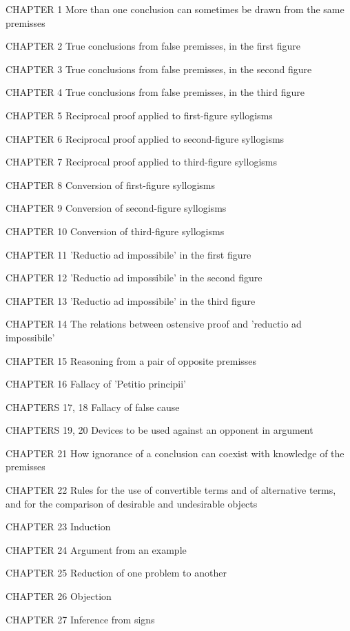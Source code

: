 CHAPTER 1
More than one conclusion can sometimes be drawn from the same
premisses

CHAPTER 2
True conclusions from false premisses, in the first figure

CHAPTER 3
True conclusions from false premisses, in the second figure

CHAPTER 4
True conclusions from false premisses, in the third figure

CHAPTER 5
Reciprocal proof applied to first-figure syllogisms

CHAPTER 6
Reciprocal proof applied to second-figure syllogisms

CHAPTER 7
Reciprocal proof applied to third-figure syllogisms

CHAPTER 8
Conversion of first-figure syllogisms

CHAPTER 9
Conversion of second-figure syllogisms

CHAPTER 10
Conversion of third-figure syllogisms

CHAPTER 11
'Reductio ad impossibile' in the first figure

CHAPTER 12
'Reductio ad impossibile' in the second figure

CHAPTER 13
'Reductio ad impossibile' in the third figure

CHAPTER 14
The relations between ostensive proof and 'reductio ad impossibile'

CHAPTER 15
Reasoning from a pair of opposite premisses

CHAPTER 16
Fallacy of 'Petitio principii'

CHAPTERS 17, 18
Fallacy of false cause

CHAPTERS 19, 20
Devices to be used against an opponent in argument

CHAPTER 21
How ignorance of a conclusion can coexist with knowledge of the
premisses

CHAPTER 22
Rules for the use of convertible terms and of alternative terms, and for
the comparison of desirable and undesirable objects

CHAPTER 23
Induction

CHAPTER 24
Argument from an example

CHAPTER 25
Reduction of one problem to another

CHAPTER 26
Objection

CHAPTER 27
Inference from signs
